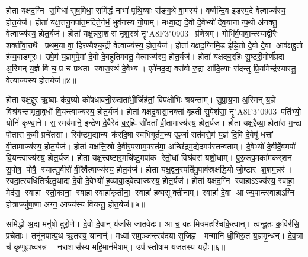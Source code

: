 होता॑ यक्षद॒ग्नि स॒मिधा॑ सुष॒मिधा॒ समि॑द्धं॒ नाभा॑ पृथि॒व्याः स॑ङ्ग॒थे वा॒मस्य॑।
वर्ष्म॑न्दि॒व इ॒डस्प॒दे वेत्वाज्य॑स्य॒ होत॒र्यज॑।
होता॑ यक्ष॒त्तनू॒नपा॑त॒मदि॑ते॒र्गर्भं॒ भुव॑नस्य गो॒पाम्।
मध्वा॒द्य दे॒वो दे॒वेभ्यो॑ देव॒यानान्प॒थो अ॑नक्तु॒ वेत्वाज्य॑स्य॒ होत॒र्यज॑।
होता॑ यक्ष॒न्नरा॒शसं॑ नृश॒स्त्रं नॄ\char"A8F3\char"0903~ प्र॑णेत्रम्।
गोभि॑र्व॒पावा॒न्त्स्याद्वी॒रैः शक्ती॑वा॒न्रथै प्रथम॒या वा॒ हिर॑ण्यैश्च॒न्द्री वेत्वाज्य॑स्य॒ होत॒र्यज॑।
होता॑ यक्षद॒ग्निमि॒ड ई॑डि॒तो दे॒वो दे॒वा आव॑क्षद्दू॒तो ह॑व्य॒वाडमू॑रः।
उपे॒मं य॒ज्ञमुपे॒मां दे॒वो दे॒वहू॑तिमवतु॒ वेत्वाज्य॑स्य॒ होत॒र्यज॑।
होता॑ यक्षद्ब॒र्‌हिः सु॒ष्टरी॒मोर्ण॑म्रदा अ॒स्मिन् य॒ज्ञे वि च॒ प्र च॑ प्रथता स्वास॒स्थं दे॒वेभ्य॑।
एमे॑नद॒द्य वस॑वो रु॒द्रा आ॑दि॒त्याः स॑दन्तु प्रि॒यमिन्द्र॑स्यास्तु॒ वेत्याज्य॑स्य॒ होत॒र्यज॑॥४॥

होता॑ यक्ष॒द्दुर॑ ऋ॒ष्वाः क॑व॒ष्यो को॑षधावनी॒रुदाता॑भी॒र्जिह॑तां॒ विपक्षो॑भिः श्रयन्ताम्।
सु॒प्रा॒य॒णा अ॒स्मिन् य॒ज्ञे विश्र॑यन्तामृता॒वृधो॑ वि॒यन्त्वाज्य॑स्य॒ होत॒र्यज॑।
होता॑ यक्षदु॒षासा॒नक्ता॑ बृह॒ती सु॒पेश॑सा॒ नॄ\char"A8F3\char"0903~पति॑भ्यो॒ योनिं॑ कृण्वा॒ने।
स॒स्मय॑माने॒ इन्द्रे॑ण दे॒वैरेदं ब॒र्॒हिः सी॑दतां वी॒तामाज्य॑स्य॒ होत॒र्यज॑।
होता॑ यक्ष॒द्दैव्या॒ होता॑रा म॒न्द्रा पोता॑रा क॒वी प्रचे॑तसा।
स्वि॑ष्टम॒द्यान्यः क॑रदि॒षा स्व॑भिगूर्तम॒न्य ऊ॒र्जा सत॑वसे॒मं य॒ज्ञं दि॒वि दे॒वेषु॑ धत्तां वी॒तामाज्य॑स्य॒ होत॒र्यज॑।
होता॑ यक्षत्ति॒स्रो दे॒वीर॒पसा॑म॒पस्त॑मा॒ अच्छि॑द्रम॒द्येदमप॑स्तन्वताम्।
दे॒वेभ्यो॑ दे॒वीर्दे॒वमपो॑ वि॒यन्त्वाज्य॑स्य॒ होत॒र्यज॑।
होता॑ यक्ष॒त्त्वष्टा॑र॒मचि॑ष्टु॒मपा॑क रेतो॒धां विश्र॑वसं यशो॒धाम्।
पु॒रु॒रूप॒मका॑मकर्‌शन सु॒पोष॒ पोषै॒ स्यात्सु॒वीरो॑ वी॒रैर्वेत्वाज्य॑स्य॒ होत॒र्यज॑।
होता॑ यक्ष॒द्वन॒स्पति॑मु॒पाव॑स्रक्षद्धि॒यो जो॒ष्टार श॒शम॒न्नर॑।
स्वदा॒त्स्वधि॑तिर्\mbox{}ऋतु॒थाद्य दे॒वो दे॒वेभ्यो॑ ह॒व्यावा॒ड्वेत्वाज्य॑स्य॒ होत॒र्यज॑।
होता॑ यक्षद॒ग्नि स्वाहाऽऽज्य॑स्य॒ स्वाहा॒ मेद॑स॒ स्वाहा स्तो॒काना॒ स्वाहा॒ स्वाहा॑कृतीना॒ स्वाहा॑ ह॒व्यसूक्तीनाम्।
स्वाहा॑ दे॒वा आज्य॒पान्त्स्वाहा॒ऽग्नि हो॒त्राज्जु॑षा॒णा अग्न॒ आज्य॑स्य वियन्तु॒ होत॒र्यज॑॥५॥\anuvakamend[प्रि॒यमिन्द्र॑स्यास्तु॒ वेत्वाज्य॑स्य॒ होत॒र्यज॑ सु॒वीरो॑ वी॒रैर्वेत्वाज्य॑स्य॒ होत॒र्यज॑ च॒त्वारि॑ च (अ॒ग्निन्तनू॒नपा॑त॒न्नरा॒शस॑म॒ग्निमि॒ड ई॑डि॒तो ब॒र्‌हिर्दुर॑ उ॒षासा॒नक्ता॒ दैव्या॑ ति॒स्रस्त्वष्टा॑रं॒ वन॒स्पति॑म॒ग्निम्।
पञ्च॒ वेत्वेको॑ वि॒यन्तु॒ द्विर्वी॒तामेको॑ वि॒यन्तु॒ द्विर्वेत्वेको॑ वियन्तु॒ होत॒र्यज॑ ॥ )]

समि॑द्धो अ॒द्य मनु॑षो दुरो॒णे।
दे॒वो दे॒वान् य॑जसि जातवेदः।
आ च॒ वह॑ मित्रमहश्चिकि॒त्वान्।
त्वन्दू॒तः क॒विर॑सि॒ प्रचे॑ताः।
तनू॑नपात्प॒थ ऋ॒तस्य॒ यानान्॑।
मध्वा॑ सम॒ञ्जन्त्स्व॑दया सुजिह्व।
मन्मा॑नि धी॒भिरु॒त य॒ज्ञमृ॒न्धन्।
दे॒व॒त्रा च॑ कृणुह्यध्व॒रन्न॑।
नरा॒शस॑स्य महि॒मान॑मेषाम्।
उप॑ स्तोषाम यज॒तस्य॑ य॒ज्ञैः॥६॥


